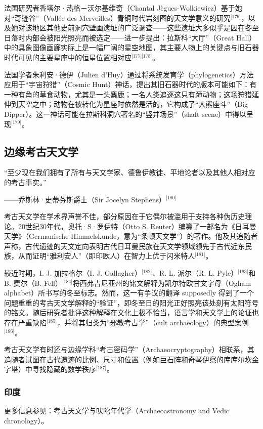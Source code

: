 法国研究者香塔尔·热格－沃尔基维奇（Chantal Jègues-Wolkiewiez）基于她对“奇迹谷”（Vallée des Merveilles）青铜时代岩刻图的天文学意义的研究\(^\text{[176]}\)，以及她对该地区其他史前洞穴壁画遗址的广泛调查——这些遗址大多似乎是因在冬至日落时内部会被阳光照亮而被选定——进一步提出：拉斯科“大厅”（Great Hall）中的具象图像画廊实际上是一幅广阔的星空地图，其主要人物上的关键点与旧石器时代可见的主要星座中的恒星位置相对应\(^\text{[177][178]}\)。  

法国学者朱利安·德伊（Julien d'Huy）通过将系统发育学（phylogenetics）方法应用于“宇宙狩猎”（Cosmic Hunt）神话，提出其旧石器时代的版本可能如下：有一种有角的草食动物，尤其是一头麋鹿；一名人类追逐这只有蹄动物；这场狩猎延伸到天空之中；动物在被转化为星座时依然是活的，它构成了“大熊座斗”（Big Dipper）。这一神话可能在拉斯科洞穴著名的“竖井场景”（shaft scene）中得以呈现\(^\text{[179]}\)。
\subsection{边缘考古天文学}
“至少现在我们拥有了所有与天文学家、德鲁伊教徒、平地论者以及其他人相对应的考古事实。”  

——乔斯林·史蒂芬斯爵士（Sir Jocelyn Stephens）\(^\text{[180]}\)

考古天文学在学术界声誉不佳，部分原因在于它偶尔被滥用于支持各种伪历史理论。20世纪30年代，奥托·S·罗伊特（Otto S. Reuter）编纂了一部名为《日耳曼天学》（Germanische Himmelskunde，意为“条顿天文学”）的著作。他及其追随者声称，古代遗迹的天文定向表明古代日耳曼民族在天文学领域领先于古代近东民族，从而证明“雅利安人”（即印欧人）在智力上优于闪米特人\(^\text{[181]}\)。

较近时期，I. J. 加拉格尔（I. J. Gallagher）\(^\text{[182]}\)、R. L. 派尔（R. L. Pyle）\(^\text{[183]}\)和B. 费尔（B. Fell）\(^\text{[184]}\)将西弗吉尼亚州的铭文解释为凯尔特欧甘文字母（Ogham alphabet）所书写的冬至标志。然而，这一有争议的翻译 supposedly 得到了一个问题重重的考古天文学解释的“验证”，即冬至日的阳光正好照亮该处刻有太阳符号的铭文。随后研究者批评这种解释在文化上极不恰当，语言学和天文学上的论证也存在严重缺陷\(^\text{[185]}\)，并将其归类为“邪教考古学”（cult archaeology）的典型案例\(^\text{[186]}\)。

考古天文学有时还与边缘学科“考古密码学”（Archaeocryptography）相联系，其追随者试图在古代遗迹的比例、尺寸和位置（例如巨石阵和奇琴伊察的库库尔坎金字塔）中寻找隐藏的数学秩序\(^\text{[187]}\)。

\subsubsection{印度}
更多信息参见：考古天文学与吠陀年代学（Archaeoastronomy and Vedic chronology）。


